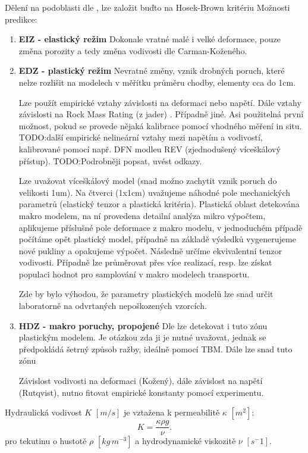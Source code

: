 \documentclass{article}
\def\todo#1{{TODO:\color{red}#1}}
\begin{document}
Dělení na podoblasti dle \cite{Perras2016}, lze založit buďto na 
Hosek-Brown kritériu \cite{}
\cite{Hajiabdolmajid2002}
Možnosti predikce:
\begin{enumerate}
    \item {\bf EIZ - elastický režim} Dokonale vratné malé i velké deformace, pouze změna porozity a tedy změna vodivosti dle Carman-Koženého.
    \item {\bf EDZ - plastický režim} Nevratné změny, vznik drobných poruch, které nelze rozlišit na modelech v měřítku průměru chodby, elementy cca do 1cm. 
    
    Lze použít empirické vztahy \cite{Rutqvist2009} závislosti na deformaci nebo napětí. Dále vztahy závislosti na Rock Mass Rating (z jader) \cite{Liu1999}. Případně jiné. 
    Asi použitelná první možnost, pokud se provede nějaká kalibrace pomocí vhodného měření in situ. \todo{další empirické nelineární vztahy mezi napětím a vodivostí, kalibrované pomocí 
    např. DFN modleu REV (zjednodušený víceškálový přístup).}
    \todo{Podrobněji popsat, uvést odkazy.}
    
    
    Lze uvažovat víceškálový model (snad možno zachytit vznik poruch do velikosti 1um). Na čtverci (1x1cm) uvažujeme náhodné pole mechanických parametrů (elastický tenzor a plastická kritéria). Plastická oblast detekována makro modelem, na ní provedena detailní analýza mikro výpočtem, aplikujeme příslušné pole deformace z makro modelu, v jednoduchém případě počítáme opět plastický model, případně na základě výsledků vygenerujeme nové pukliny a opakujeme výpočet. Následně určíme ekvivalentní tenzor vodivosti. Případně lze průměrovat přes více realizací, resp. lze získat populaci hodnot pro samplování v makro modelech transportu. 
    
    Zde by bylo výhodou, že parametry plastických modelů lze snad určit laboratorně na odvrtaných nepoškozených vzorcích.
    
    \item {\bf HDZ - makro poruchy, propojené} 
    Dle \cite{Perras2016} lze detekovat i tuto zónu plastickým modelem. Je otázkou zda ji je nutné uvažovat, jednak se předpokládá šetrný způsob ražby, ideálně pomocí TBM. Dále lze snad tuto zónu   
    
    Závislost vodivosti na deformaci (Kožený), dále závislost na napětí (Rutqvist), nutno fitovat empirické konstanty pomocí experimentu. 
\end{enumerate}


Hydraulická vodivost $K$ $[m/s]$ je vztažena k permeabilitě $\kappa$ $[m^2]$:
\[
    K =\frac{\kappa \rho g}{\nu}.
\]
pro tekutinu o hustotě $\rho$ $[kg\, m^{-3}]$ a hydrodynamické viskozitě $\nu$ $[s^-1]$.
\end{document}
